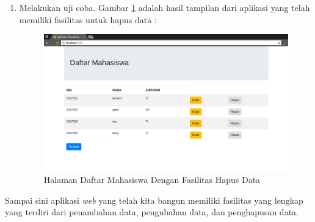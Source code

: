 \begin{enumerate}
\begin{lstlisting}
    @RequestMapping(value = "/tambah-data", method = RequestMethod.POST) 
    public void tambahData(@RequestBody Mahasiswa mhs) {
        mhsRepo.save(mhs);
    }    
    
    @RequestMapping(value = "/get-mahasiswa-by-nim/{nim}")
    public Mahasiswa getMahasiswaByNim(@PathVariable("nim") String nim) {
        return mhsRepo.findOne(nim);
    }
    
    @RequestMapping(value = "/simpan-edit-data", method = RequestMethod.POST)
    public void simpanEditData(@RequestBody Mahasiswa mhs) {
        mhsRepo.save(mhs);
    }
    
    (*\texttt{@RequestMapping(value = "/hapus/{nim}", }*)
        (*\texttt{method = RequestMethod.DELETE) }*)
    (*\texttt{public void deleteData(@PathVariable("nim") String nim) \{ }*)
      (*\texttt{mhsRepo.delete(nim); }*)
    (*\texttt{\} }*)
}
	\end{lstlisting}
	
	\item Melakukan uji coba. Gambar \ref{fig:halaman-dengan-hapus-data} adalah hasil tampilan dari aplikasi yang telah memiliki fasilitas untuk hapus data :
	
	\begin{figure}[H]
		\centering
		\includegraphics[width=1\textwidth]{./resources/037-halaman-dengan-hapus-data}
		\caption{Halaman Daftar Mahasiswa Dengan Fasilitas Hapus Data}
		\label{fig:halaman-dengan-hapus-data}
	\end{figure}
	
\end{enumerate}

Sampai sini aplikasi \textit{web} yang telah kita bangun memiliki fasilitas yang lengkap yang terdiri dari penambahan data, pengubahan data, dan penghapusan data.